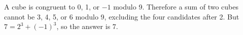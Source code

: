 A cube is congruent to 0, 1, or $-1$ modulo 9. Therefore a sum of two cubes cannot be 3, 4, 5, or 6 modulo 9, excluding the four candidates after 2. But $7=2^3+(-1)^3$, so the answer is $\boxed7$.
